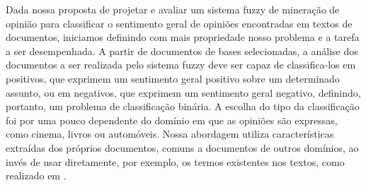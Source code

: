 \documentclass[template.tex]{subfiles}
\begin{document}


%
%

Dada nossa proposta de projetar e avaliar um sistema fuzzy de mineração de opinião para classificar o sentimento geral de opiniões encontradas em textos de documentos, iniciamos definindo com mais propriedade nosso problema e a tarefa a ser desempenhada. A partir de documentos de bases selecionadas, a análise dos documentos a ser realizada pelo sistema fuzzy deve ser capaz de classifica-los em positivos, que exprimem um sentimento geral positivo sobre um determinado assunto, ou em negativos, que exprimem um sentimento geral negativo, definindo, portanto, um problema de classificação binária. A escolha do tipo da classificação foi por uma pouco dependente do domínio em que as opiniões são expressas, como cinema, livros ou automóveis. Nossa abordagem utiliza características extraídas dos próprios documentos, comuns a documentos de outros domínios, ao invés de usar diretamente, por exemplo, os termos existentes nos textos, como realizado em .
\end{document}
